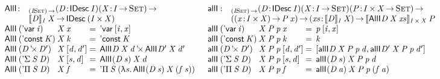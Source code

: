 \begin{figure*}

\[
\begin{array}{ll}
\stk{
\begin{array}{@{}ll}
\AllI{\!}{\!}{\!}{\!} : & _{\PI{\V{I}}{\Set}}
                          \PITEL{\V{D}}{\IDesc{\V{I}}}
                          \PI{\V{X}}{\V{I} \To \Set} \\
                        & \idescop{\V{D}}{\V{I}}{\V{X}} \To
                          \IDesc{(\TIMES{\V{I}}{\V{X}})}
\end{array} \\
\begin{array}{@{}l@{}l@{\:=\:\:}l}
\AllI{\:}{(\DVar{\V{i}})}{& \V{X}}{\V{x}} &
    \DVar{\pair{\V{i}}{\V{x}}{}} \\
\AllI{\:}{(\DConst{\V{K}})}{& \V{X}}{\V{k}} &
    \DConst{\V{K}} \\
\AllI{\:}{(\DProd{\V{D}}{\V{D'}})}{& \V{X}}{\pair{\V{d}}{\V{d'}}{}} &
    \DProd{\AllI{}{\V{D}}{\V{X}}{\V{d}}}{\AllI{}{\V{D'}}{\V{X}}{\V{d'}}} \\
\AllI{\:}{(\DSigma{\V{S}}{\V{D}})}{& \V{X}}{\pair{\V{s}}{\V{d}}{}} &
    \AllI{}{(\V{D}\: \V{s})}{\V{X}}{\V{d}} \\
\AllI{\:}{(\DPi{\V{S}}{\V{D}})}{& \V{X}}{\V{f}} &
    \DPi{\V{S}}{(\LAM{\V{s}} \AllI{}{(\V{D}\: \V{s})}{\V{X}}{(\V{f}\: \V{s})})}
\end{array}
}
&
\stk{
\begin{array}{@{}ll}
\allI{\!}{\!}{\!}{\!}{\!}{\!} : & _{\PI{\V{I}}{\Set}}
                                  \PITEL{\V{D}}{\IDesc{\V{I}}}
                                  \PITEL{\V{X}}{\V{I} \To \Set} 
                                  \PI{\V{P}}{\TIMES{\V{I}}{\V{X}} \To \Set} \\
                                & (\PI{\V{x}}{\TIMES{\V{I}}{\V{X}}} \V{P}\: \V{x}) \To
                                  \PI{\V{xs}}{\idescop{\V{D}}{\V{I}}{\V{X}}} 
                                  \idescop{\AllI{}{\V{D}}{\V{X}}{\V{xs}}}{\TIMES{\V{I}}{\V{X}}}{\V{P}}
\end{array} \\
\begin{array}{@{}l@{}l@{\:=\:\:}l}
\allI{\:}{(\DVar{\V{i}})}{& \V{X}}{\V{P}}{\V{p}}{\V{x}} &
    \V{p}\: \pair{\V{i}}{\V{x}}{} \\
\allI{\:}{(\DConst{\V{K}})}{& \V{X}}{\V{P}}{\V{p}}{\V{k}} &
    \V{k} \\
\allI{\:}{(\DProd{\V{D}}{\V{D'}})}{& \V{X}}{\V{P}}{\V{p}}{\pair{\V{d}}{\V{d'}}{}} &
    \pair{\allI{}{\V{D}}{\V{X}}{\V{P}}{\V{p}}{\V{d}}}
         {\allI{}{\V{D'}}{\V{X}}{\V{P}}{\V{p}}{\V{d'}}}{} \\
\allI{\:}{(\DSigma{\V{S}}{\V{D}})}{& \V{X}}{\V{P}}{\V{p}}{\pair{\V{s}}{\V{d}}{}} &
    \allI{}{(\V{D}\: \V{s})}{\V{X}}{\V{P}}{\V{p}}{\V{d}} \\
\allI{\:}{(\DPi{\V{S}}{\V{D}})}{& \V{X}}{\V{P}}{\V{p}}{\V{f}} &
    \allI{}{(\V{D}\: \V{a})}{\V{X}}{\V{P}}{\V{p}}{(\V{f}\: \V{a})}
\end{array}
\end{array}
}
\]


\end{figure*}
